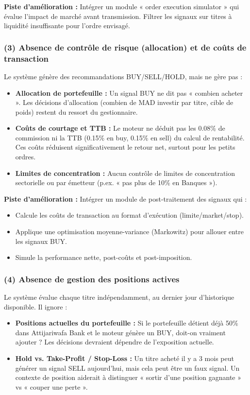 \documentclass{rapportENSIAS} %
\begin{document}
\vspace{0.2cm}
\noindent
\textbf{Piste d'amélioration :} Intégrer un module « order execution simulator » qui évalue l'impact de marché avant transmission. Filtrer les signaux sur titres à liquidité insuffisante pour l'ordre envisagé.

\subsubsection*{(3) Absence de contrôle de risque (allocation) et de coûts de transaction}

\noindent
Le système génère des recommandations BUY/SELL/HOLD, mais ne gère pas :
\begin{itemize}
    \item \textbf{Allocation de portefeuille :} Un signal BUY ne dit pas « combien acheter ». Les décisions d'allocation (combien de MAD investir par titre, cible de poids) restent du ressort du gestionnaire.
    \item \textbf{Coûts de courtage et TTB :} Le moteur ne déduit pas les 0.08\% de commission ni la TTB (0.15\% en buy, 0.15\% en sell) du calcul de rentabilité. Ces coûts réduisent significativement le retour net, surtout pour les petits ordres.
    \item \textbf{Limites de concentration :} Aucun contrôle de limites de concentration sectorielle ou par émetteur (p.ex. « pas plus de 10\% en Banques »).
\end{itemize}

\vspace{0.2cm}
\noindent
\textbf{Piste d'amélioration :} Intégrer un module de post-traitement des signaux qui :
\begin{itemize}
    \item Calcule les coûts de transaction au format d'exécution (limite/market/stop).
    \item Applique une optimisation moyenne-variance (Markowitz) pour allouer entre les signaux BUY.
    \item Simule la performance nette, post-coûts et post-imposition.
\end{itemize}

\subsubsection*{(4) Absence de gestion des positions actives}

\noindent
Le système évalue chaque titre indépendamment, au dernier jour d'historique disponible. Il ignore :
\begin{itemize}
    \item \textbf{Positions actuelles du portefeuille :} Si le portefeuille détient déjà 50\% dans Attijariwafa Bank et le moteur génère un BUY, doit-on vraiment ajouter ? Les décisions devraient dépendre de l'exposition actuelle.
    \item \textbf{Hold vs. Take-Profit / Stop-Loss :} Un titre acheté il y a 3 mois peut générer un signal SELL aujourd'hui, mais cela peut être un faux signal. Un contexte de position aiderait à distinguer « sortir d'une position gagnante » vs « couper une perte ».
\end{itemize}
\end{document}
